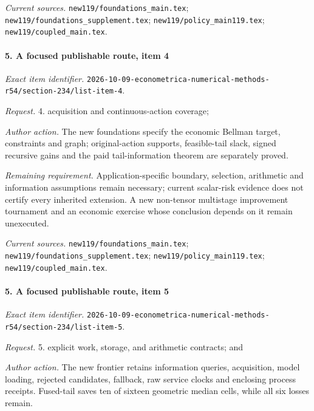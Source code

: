 \par\emph{Current sources.} \nolinkurl{new119/foundations_main.tex}; \nolinkurl{new119/foundations_supplement.tex}; \nolinkurl{new119/policy_main119.tex}; \nolinkurl{new119/coupled_main.tex}.

\paragraph{5. A focused publishable route, item 4}

\emph{Exact item identifier.} \nolinkurl{2026-10-09-econometrica-numerical-methods-r54/section-234/list-item-4}.

\par\emph{Request.} 4. acquisition and continuous-action coverage;

\par\emph{Author action.} The new foundations specify the economic Bellman target, constraints and graph; original-action supports, feasible-tail slack, signed recursive gains and the paid tail-information theorem are separately proved.

\par\emph{Remaining requirement.} Application-specific boundary, selection, arithmetic and information assumptions remain necessary; current scalar-risk evidence does not certify every inherited extension. A new non-tensor multistage improvement tournament and an economic exercise whose conclusion depends on it remain unexecuted.

\par\emph{Current sources.} \nolinkurl{new119/foundations_main.tex}; \nolinkurl{new119/foundations_supplement.tex}; \nolinkurl{new119/policy_main119.tex}; \nolinkurl{new119/coupled_main.tex}.

\paragraph{5. A focused publishable route, item 5}

\emph{Exact item identifier.} \nolinkurl{2026-10-09-econometrica-numerical-methods-r54/section-234/list-item-5}.

\par\emph{Request.} 5. explicit work, storage, and arithmetic contracts; and

\par\emph{Author action.} The new frontier retains information queries, acquisition, model loading, rejected candidates, fallback, raw service clocks and enclosing process receipts. Fused-tail saves ten of sixteen geometric median cells, while all six losses remain.

